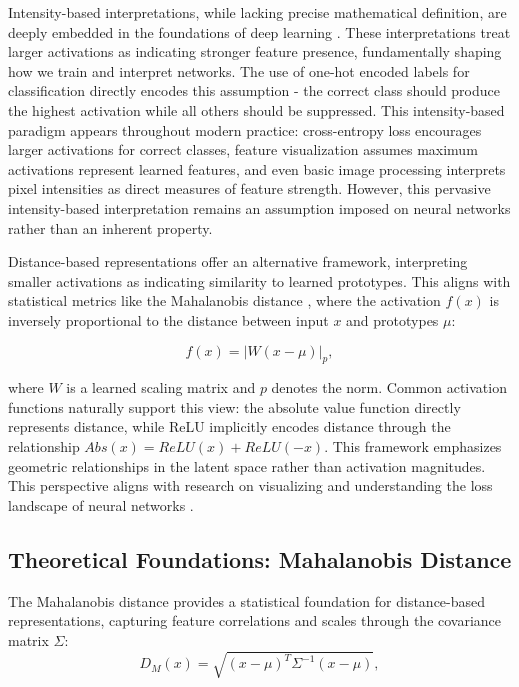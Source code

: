 Intensity-based interpretations, while lacking precise mathematical definition, are deeply embedded in the foundations of deep learning \cite{goodfellow2016deep}. These interpretations treat larger activations as indicating stronger feature presence, fundamentally shaping how we train and interpret networks. The use of one-hot encoded labels for classification directly encodes this assumption - the correct class should produce the highest activation while all others should be suppressed. This intensity-based paradigm appears throughout modern practice: cross-entropy loss encourages larger activations for correct classes, feature visualization \cite{erhan2009visualizing, olah2017feature} assumes maximum activations represent learned features, and even basic image processing interprets pixel intensities as direct measures of feature strength. However, this pervasive intensity-based interpretation remains an assumption imposed on neural networks rather than an inherent property.

Distance-based representations offer an alternative framework, interpreting smaller activations as indicating similarity to learned prototypes. This aligns with statistical metrics like the Mahalanobis distance \cite{mahalanobis1936generalized}, where the activation $f(x)$ is inversely proportional to the distance between input $x$ and prototypes $\mu$:

\begin{equation}
f(x) = |W(x - \mu)|_p,
\end{equation}

where $W$ is a learned scaling matrix and $p$ denotes the norm. Common activation functions naturally support this view: the absolute value function directly represents distance, while ReLU implicitly encodes distance through the relationship $Abs(x) = ReLU(x) + ReLU(-x)$. This framework emphasizes geometric relationships in the latent space rather than activation magnitudes. This perspective aligns with research on visualizing and understanding the loss landscape of neural networks \cite{li2018visualizing, goodfellow2015qualitatively}.

\subsection{Theoretical Foundations: Mahalanobis Distance}

The Mahalanobis distance provides a statistical foundation for distance-based representations, capturing feature correlations and scales through the covariance matrix $\Sigma$:
\begin{equation}
    D_M(x) = \sqrt{(x - \mu)^T \Sigma^{-1} (x - \mu)},
\end{equation}

